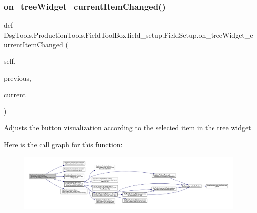 \subsubsection{\texorpdfstring{on\+\_\+tree\+Widget\+\_\+current\+Item\+Changed()}{on\_treeWidget\_currentItemChanged()}}
{\footnotesize\ttfamily def Dsg\+Tools.\+Production\+Tools.\+Field\+Tool\+Box.\+field\+\_\+setup.\+Field\+Setup.\+on\+\_\+tree\+Widget\+\_\+current\+Item\+Changed (\begin{DoxyParamCaption}\item[{}]{self,  }\item[{}]{previous,  }\item[{}]{current }\end{DoxyParamCaption})}

\begin{DoxyVerb}Adjusts the button visualization according to the selected item in the tree widget
\end{DoxyVerb}
 Here is the call graph for this function\+:
\nopagebreak
\begin{figure}[H]
\begin{center}
\leavevmode
\includegraphics[width=350pt]{class_dsg_tools_1_1_production_tools_1_1_field_tool_box_1_1field__setup_1_1_field_setup_a102c7b87541e966cd5042cd505fa4f1e_cgraph}
\end{center}
\end{figure}
\mbox{\label{class_dsg_tools_1_1_production_tools_1_1_field_tool_box_1_1field__setup_1_1_field_setup_a23cbaa8a07f0b9084a1700358d201a04}} 
